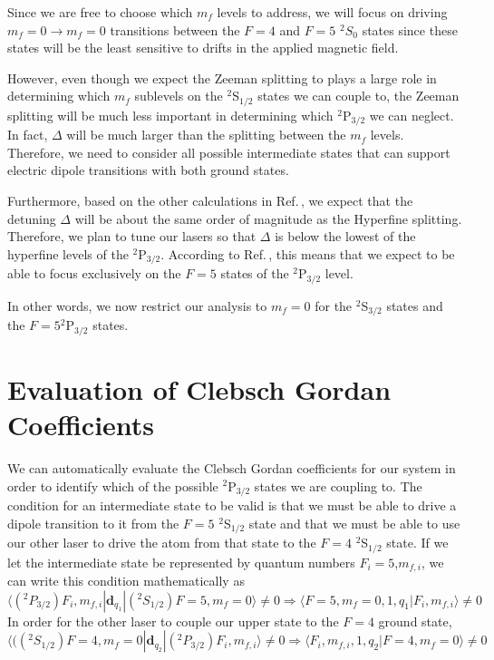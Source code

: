 Since we are free to choose which $m_f$ levels to address, we will focus on driving $m_f=0\rightarrow m_f=0$ transitions between the $F=4$ and $F=5$ $^2 S_{0}$ states since these states will be the least sensitive to drifts in the applied magnetic field. 

However, even though we expect the Zeeman splitting to plays a large role in determining which $m_f$ sublevels on the $^2$S$_{1/2}$ states we can couple to, the Zeeman splitting will be much less important in determining which $^2$P$_{3/2}$ we can neglect. In fact, $\Delta$ will be much larger than the splitting between the $m_f$ levels. Therefore, we need to consider all possible intermediate states that can support electric dipole transitions with both ground states. %


Furthermore, based on the other calculations in Ref.\,\cite{cjeDiss}, we expect that the detuning $\Delta$ will be about the same order of magnitude as the Hyperfine splitting. Therefore, we plan to tune our lasers so that $\Delta$ is below the lowest of the hyperfine levels of the $^2$P$_{3/2}$. According to Ref.\,\cite{tableOfHyperfine deetuings}, this means that we expect to be able to focus exclusively on the $F=5$ states of the $^2$P$_{3/2}$ level.

In other words, we now restrict our analysis to $m_f=0$ for the $^2$S$_{3/2}$ states and the $F=5$$^2$P$_{3/2}$ states.

\section{Evaluation of Clebsch Gordan Coefficients}

We can automatically evaluate the Clebsch Gordan coefficients for our system in order to identify which of the possible $^2$P$_{3/2}$ states we are coupling to. The condition for an intermediate state to be valid is that we must be able to drive a dipole transition to it from the $F=5$ $^2$S$_{1/2}$ state and that we must be able to use our other laser to drive the atom from that state to the $F=4$ $^2$S$_{1/2}$ state. If we let the intermediate state be represented by quantum numbers $F_i=5$,$m_{f,i}$, we can write this condition mathematically as  
\begin{equation}
\langle (^2P_{3/2}) F_i,m_{f,i}|\mathbf{d}_{q_1}|(^2S_{1/2})F=5,m_f=0\rangle\neq 0 \Rightarrow \langle F=5,m_f=0,1,q_1|F_i,m_{f,i}\rangle \neq 0  \label{thing1}
\end{equation}
In order for the other laser to couple our upper state to the $F=4$ ground state, 
\begin{equation}
\langle ((^2S_{1/2})F=4,m_f=0|\mathbf{d}_{q_2}|(^2P_{3/2}) F_i,m_{f,i}\rangle\neq 0 \Rightarrow \langle F_i,m_{f,i},1,q_2|F=4,m_f=0 \rangle \neq 0 \label{thing2}
\end{equation}

